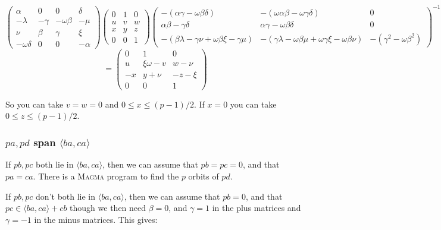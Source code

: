 \documentclass[10pt]{article}
\begin{document}
\[
\left( 
\begin{array}{cccc}
\alpha & 0 & 0 & \delta \\ 
-\lambda & -\gamma & -\omega \beta & -\mu \\ 
\nu & \beta & \gamma & \xi \\ 
-\omega \delta & 0 & 0 & -\alpha%
\end{array}%
\right) \left( 
\begin{array}{ccc}
0 & 1 & 0 \\ 
u & v & w \\ 
x & y & z \\ 
0 & 0 & 1%
\end{array}%
\right) \left( 
\begin{array}{ccc}
-(\alpha \gamma -\omega \beta \delta ) & -(\omega \alpha \beta -\omega
\gamma \delta ) & 0 \\ 
\alpha \beta -\gamma \delta & \alpha \gamma -\omega \beta \delta & 0 \\ 
-(\beta \lambda -\gamma \nu +\omega \beta \xi -\gamma \mu ) & -(\gamma
\lambda -\omega \beta \mu +\omega \gamma \xi -\omega \beta \nu ) & -(\gamma
^{2}-\omega \beta ^{2})%
\end{array}%
\right) ^{-1} 
\]
\[
=\left( 
\begin{array}{ccc}
0 & 1 & 0 \\ 
u & \xi \omega -v & w-\nu \\ 
-x & y+\nu & -z-\xi \\ 
0 & 0 & 1%
\end{array}%
\right) 
\]

So you can take $v=w=0$ and $0\leq x\leq (p-1)/2$. If $x=0$ you can take $%
0\leq z\leq (p-1)/2$.

\subsubsection{$pa,pd$ span $\langle ba,ca\rangle $}

If $pb,pc$ both lie in $\langle ba,ca\rangle $, then we can assume that $%
pb=pc=0$, and that $pa=ca$. There is a \textsc{Magma} program to find the $p$
orbits of $pd$.

If $pb,pc$ don't both lie in $\langle ba,ca\rangle $, then we can assume
that $pb=0$, and that $pc\in \langle ba,ca\rangle +cb$ though we then need $%
\beta =0$, and $\gamma =1$ in the plus matrices and $\gamma =-1$ in the
minus matrices. This gives:
\end{document}
